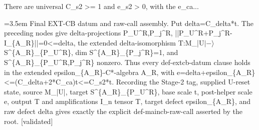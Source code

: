 \documentclass{article}
\newcommand{\step}[1]{\par\noindent\hangindent=3.5em\hangafter=1%
  \makebox[3.5em][l]{\textbf{#1.}}}
\newcommand{\steptag}[1]{\hfill{\small\textsf{[#1]}}}
\begin{document}
\begin{proofbox}{There are universal C\_s2 >= 1 and e\_s2 > 0, with the e\_ca...}
\step{1.7} Final EXT-CB datum and raw-call assembly. Put delta=C\_delta*t. The preceding nodes give delta-projections P\_U\textasciicircum{}R,P\_j\textasciicircum{}R, ||P\_U\textasciicircum{}R+P\_j\textasciicircum{}R-I\_\{A\_R\}||=0<=delta, the extended delta-isomorphism T:M\_|U$|-\rangle$S\textasciicircum{}\{A\_R\}\_\{P\_U\textasciicircum{}R\}, dim S\textasciicircum{}\{A\_R\}\_\{P\_j\textasciicircum{}R\}=1, and S\textasciicircum{}\{A\_R\}\_\{P\_U\textasciicircum{}R,P\_j\textasciicircum{}R\} nonzero. Thus every def-extcb-datum clause holds in the extended epsilon\_\{A\_R\}-C*-algebra A\_R, with e=delta+epsilon\_\{A\_R\}<=(C\_delta+2*C\_ca)t<=C\_s2*t. Recording the Stage-2 tag, supplied U-reset state, source M\_|U|, target S\textasciicircum{}\{A\_R\}\_\{P\_U\textasciicircum{}R\}, base scale t, post-helper scale e, output T and amplifications I\_n tensor T, target defect epsilon\_\{A\_R\}, and raw defect delta gives exactly the explicit def-maincb-raw-call asserted by the root. \steptag{validated} \\[4pt]
\end{proofbox}
\end{document}
